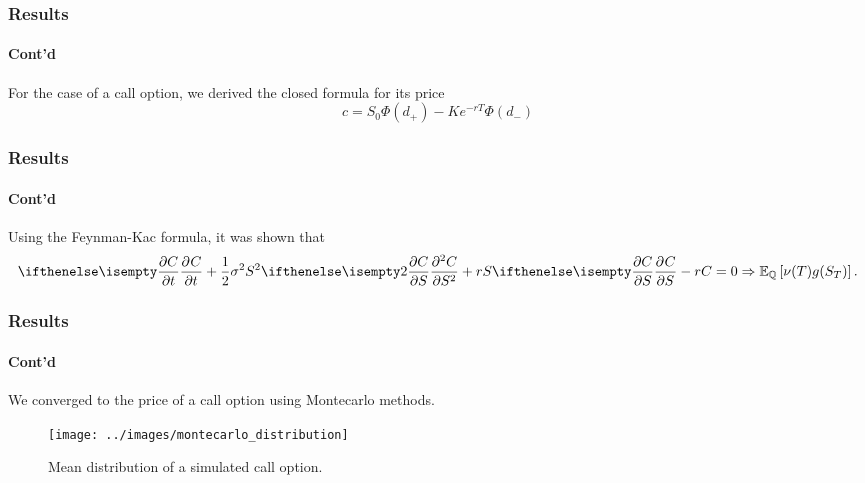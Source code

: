 \documentclass{beamer}
\begin{document}
\begin{frame}
	\frametitle{Results}
	\framesubtitle{Cont'd}
	For the case of a call option, we derived the closed formula for its price
	\begin{equation} \label{eq:risk-neutral-price}
		c = S_0 \Phi(d_+) - Ke^{-rT}\Phi(d_-)
	\end{equation}
\end{frame}

\begin{frame}
	\frametitle{Results}
	\framesubtitle{Cont'd}
	Using the Feynman-Kac formula, it was shown that
	\begin{equation}
		\partialwrt{C}{t} + \frac{1}{2}\sigma^2S^2\partialwrt[2]{C}{S} + rS\partialwrt{C}{S} - rC = 0 \Rightarrow \ExpMeasure{\Qm}{\nu(T)g(S_T)}.
	\end{equation}
\end{frame}


\begin{frame}
	\frametitle{Results}
	\framesubtitle{Cont'd}
	We converged to the price of a call option using Montecarlo methods.
		\begin{figure}[h]
		\centering
	  \texttt{[image: ../images/montecarlo\_distribution]}
	  \caption{Mean distribution of a simulated call option.}
	\end{figure}
\end{frame}



\nocite{*}

\end{document}
